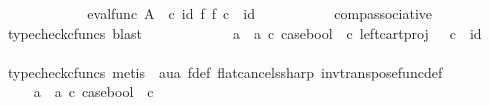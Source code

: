 \begin{isabellebody}
\ \ \ \ \ \ \ \isamarkupfalse%
\ \isamarkupfalse%
\ {\isachardoublequoteopen}{\isachardot}{\kern0pt}{\isachardot}{\kern0pt}{\isachardot}{\kern0pt}\ {\isacharequal}{\kern0pt}\ {\isacharparenleft}{\kern0pt}eval{\isacharunderscore}{\kern0pt}func\ A\ {\isasymOmega}\ {\isasymcirc}\isactrlsub c\ {\isacharparenleft}{\kern0pt}id{\isacharparenleft}{\kern0pt}{\isasymOmega}{\isacharparenright}{\kern0pt}\ {\isasymtimes}\isactrlsub f\ f{\isacharparenright}{\kern0pt}{\isacharparenright}{\kern0pt}\ {\isasymcirc}\isactrlsub c\ {\isasymlangle}{\isasymf}{\isacharcomma}{\kern0pt}\ id{\isacharparenleft}{\kern0pt}{\isasymone}{\isacharparenright}{\kern0pt}{\isasymrangle}{\isachardoublequoteclose}\isanewline
\ \ \ \ \ \ \ \ \ \isamarkupfalse%
\ comp{\isacharunderscore}{\kern0pt}associative{}\ \isamarkupfalse%
\ {\isacharparenleft}{\kern0pt}typecheck{\isacharunderscore}{\kern0pt}cfuncs{\isacharcomma}{\kern0pt}\ blast{\isacharparenright}{\kern0pt}\isanewline
\ \ \ \ \ \ \ \isamarkupfalse%
\ \isamarkupfalse%
\ {\isachardoublequoteopen}{\isachardot}{\kern0pt}{\isachardot}{\kern0pt}{\isachardot}{\kern0pt}\ {\isacharequal}{\kern0pt}\ {\isacharparenleft}{\kern0pt}{\isacharparenleft}{\kern0pt}a{}\ {\isasymamalg}\ a{}{\isacharparenright}{\kern0pt}\ {\isasymcirc}\isactrlsub c\ case{\isacharunderscore}{\kern0pt}bool\ \ {\isasymcirc}\isactrlsub c\ left{\isacharunderscore}{\kern0pt}cart{\isacharunderscore}{\kern0pt}proj\ {\isasymOmega}\ {\isasymone}{\isacharparenright}{\kern0pt}\ {\isasymcirc}\isactrlsub c\ {\isasymlangle}{\isasymf}{\isacharcomma}{\kern0pt}\ id{\isacharparenleft}{\kern0pt}{\isasymone}{\isacharparenright}{\kern0pt}{\isasymrangle}{\isachardoublequoteclose}\isanewline
\ \ \ \ \ \ \ \ \ \isamarkupfalse%
\ {\isacharparenleft}{\kern0pt}typecheck{\isacharunderscore}{\kern0pt}cfuncs{\isacharcomma}{\kern0pt}\ metis\ \ aua\ f{\isacharunderscore}{\kern0pt}def\ flat{\isacharunderscore}{\kern0pt}cancels{\isacharunderscore}{\kern0pt}sharp\ inv{\isacharunderscore}{\kern0pt}transpose{\isacharunderscore}{\kern0pt}func{\isacharunderscore}{\kern0pt}def{}{\isacharparenright}{\kern0pt}\isanewline
\ \ \ \ \ \ \ \isamarkupfalse%
\ \isamarkupfalse%
\ {\isachardoublequoteopen}{\isachardot}{\kern0pt}{\isachardot}{\kern0pt}{\isachardot}{\kern0pt}\ {\isacharequal}{\kern0pt}\ {\isacharparenleft}{\kern0pt}a{}\ {\isasymamalg}\ a{}{\isacharparenright}{\kern0pt}\ {\isasymcirc}\isactrlsub c\ case{\isacharunderscore}{\kern0pt}bool\ \ {\isasymcirc}\isactrlsub c\ {\isasymf}{\isachardoublequoteclose}\isanewline

\end{isabellebody}
